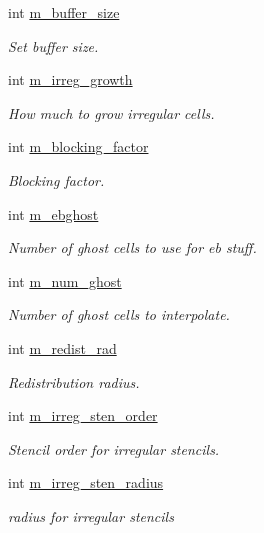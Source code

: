 \begin{DoxyCompactItemize}
int \hyperlink{classamr__mesh_aa2e19f25d2a5256a97c9d62d77afb923}{m\+\_\+buffer\+\_\+size}
\begin{DoxyCompactList}\small\item\em Set buffer size. \end{DoxyCompactList}\item 
int \hyperlink{classamr__mesh_ab79055020b938a495ed2ac142fcc5b11}{m\+\_\+irreg\+\_\+growth}
\begin{DoxyCompactList}\small\item\em How much to grow irregular cells. \end{DoxyCompactList}\item 
int \hyperlink{classamr__mesh_a54d274eb55f8e9fe14bde034e8fe1e65}{m\+\_\+blocking\+\_\+factor}
\begin{DoxyCompactList}\small\item\em Blocking factor. \end{DoxyCompactList}\item 
int \hyperlink{classamr__mesh_a14a7a1d4168963725748659b52bc1d5c}{m\+\_\+ebghost}
\begin{DoxyCompactList}\small\item\em Number of ghost cells to use for eb stuff. \end{DoxyCompactList}\item 
int \hyperlink{classamr__mesh_a688410f30cd6b8b1fdc665bc1c19fa83}{m\+\_\+num\+\_\+ghost}
\begin{DoxyCompactList}\small\item\em Number of ghost cells to interpolate. \end{DoxyCompactList}\item 
int \hyperlink{classamr__mesh_abc978abb707e68962929b519c9ece99f}{m\+\_\+redist\+\_\+rad}
\begin{DoxyCompactList}\small\item\em Redistribution radius. \end{DoxyCompactList}\item 
int \hyperlink{classamr__mesh_acf4cbc6d589dca94abfb5c1d09d87df0}{m\+\_\+irreg\+\_\+sten\+\_\+order}
\begin{DoxyCompactList}\small\item\em Stencil order for irregular stencils. \end{DoxyCompactList}\item 
int \hyperlink{classamr__mesh_acb284e9758d89887c332bff1ea5bbc0d}{m\+\_\+irreg\+\_\+sten\+\_\+radius}
\begin{DoxyCompactList}\small\item\em radius for irregular stencils \end{DoxyCompactList}\item 

\end{DoxyCompactItemize}
